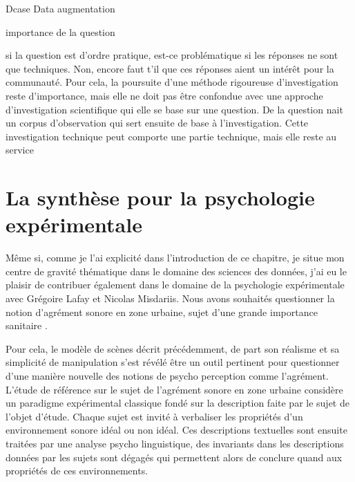 Dcase  \cite{mesa} Data augmentation

importance de la question

si la question est d'ordre pratique, est-ce problématique si les réponses ne sont que techniques. Non, encore faut t'il que ces réponses aient un intérêt pour la communauté. Pour cela, la poursuite d'une méthode rigoureuse d'investigation reste d'importance, mais elle ne doit pas être confondue avec une approche d'investigation scientifique qui elle se base sur une question. De la question nait un corpus d'observation qui sert ensuite de base à l'investigation. Cette investigation technique peut comporte une partie technique, mais elle reste au service

\section{La synthèse pour la psychologie expérimentale}

Même si, comme je l'ai explicité dans l'introduction de ce chapitre, je situe mon centre de gravité thématique dans le domaine des sciences des données, j'ai eu le plaisir de contribuer également dans le domaine de la psychologie expérimentale avec Grégoire Lafay et Nicolas Misdariis. Nous avons souhaités questionner la notion d'agrément sonore en zone urbaine, sujet d'une grande importance sanitaire \cite{europe}.

Pour cela, le modèle de scènes décrit précédemment, de part son réalisme et sa simplicité de manipulation s'est révélé être un outil pertinent pour questionner d'une manière nouvelle des notions de psycho perception comme l'agrément. L'étude de référence sur le sujet de l'agrément sonore en zone urbaine \cite{guastavino} considère un paradigme expérimental classique fondé sur la description faite par le sujet de l'objet d'étude. Chaque sujet est invité à verbaliser les propriétés d'un environnement sonore idéal ou non idéal. Ces descriptions textuelles sont ensuite traitées par une analyse psycho linguistique, des invariants dans les descriptions données par les sujets sont dégagés qui permettent alors de conclure quand aux propriétés de ces environnements.

